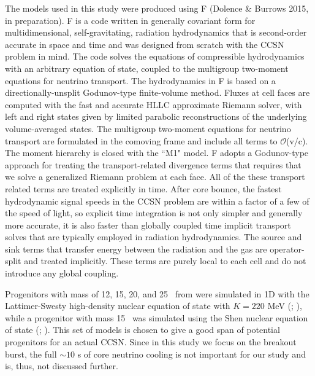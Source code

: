 
The models used in this study were produced using F{} (Dolence 
\& Burrows 2015, in preparation).
F{} is a code written in generally covariant form for 
multidimensional,
self-gravitating, radiation hydrodynamics that is second-order accurate in
space and time and was designed from scratch with the CCSN 
problem in mind. The code solves the equations of compressible
hydrodynamics with an arbitrary equation of state, coupled to the
multigroup two-moment equations for neutrino transport. The hydrodynamics
in F{} is based on a directionally-unsplit Godunov-type finite-volume
method. Fluxes at cell faces are computed with the fast and accurate HLLC
approximate Riemann solver, with left and right states given by limited
parabolic reconstructions of the underlying volume-averaged states. The
multigroup two-moment equations for neutrino transport are formulated in
the comoving frame and include all terms to $\mathcal{O}$(v/c). 
The moment hierarchy
is closed with the ``M1" model. F{} adopts a Godunov-type approach for
treating the transport-related divergence terms that requires that we
solve a generalized Riemann problem at each face. All of the these
transport related terms are treated explicitly in time. After core bounce,
the fastest hydrodynamic signal speeds in the CCSN 
problem are within a factor of a few of the speed of light, so explicit
time integration is not only simpler and generally more accurate, it is
also faster than globally coupled time implicit transport solves that are
typically employed in radiation hydrodynamics. The source and sink terms
that transfer energy between the radiation and the gas are operator-split
and treated implicitly. These terms are purely local to each cell and do
not introduce any global coupling.

 Progenitors with mass of 12, 15, 20, and
25 \Msol\ from \cite{woosleyheger2007} 
were simulated in 1D with the Lattimer-Swesty high-density
nuclear equation of state with $K=220$ MeV (\ls;
\citealt{lattimerswesty1991}), while a progenitor with mass 15
\Msol\ was simulated using the Shen nuclear equation of state (\shen;
\citealp{shenetaljul1998,shenetalnov1998}).  This set of models is
chosen to give a good span of potential progenitors for an actual
CCSN. 
 Since in this study we focus on the breakout burst, the full ${\sim}10$ s of
core neutrino cooling is not important for our study and is, thus, not
discussed further.

